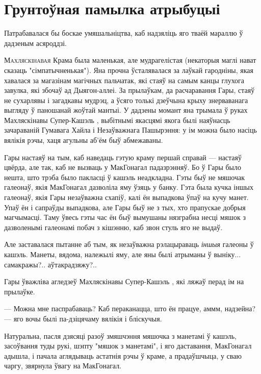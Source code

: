 \chapter{Грунтоўная памылка атрыбуцыі}

\begin{chapterOpeningQuote}
Патрабавалася бы боскае умяшальніцтва, каб надзяліць яго тваёй мараллю ў дадзеным асяроддзі. 
\end{chapterOpeningQuote}

\lettrine{М}{ахляскінавая} Крама была маленькая, але мудрагелістая (некаторыя маглі нават сказаць 
"сімпатычненькая"). Яна прочна ўсталявалася за лаўкай гародніны, якая хавалася за магазінам 
магічных пальчатак, які стаяў на самым канцы глухога завулка, які збочаў ад
Дыягон-аллеі. За прылаўкам, да расчаравання Гары, стаяў не сухарлявы і загадкавы мудрэц, 
а ўсяго толькі дзеўчына крыху знерваванага выгляду ў паношанай жоўтай мантыі. У дадзены
момант яна трымала ў руках Махляскінавы Супер-Кашэль , выбітнымі якасцямі якога былі
наяўнасць зачараваній Гумавага Хайла і Незаўважнага Пашырэння: у ім можна было насіць
вялікія рэчы, хаця агульны аб'ём быў абмежаваны.

Гары настаяў на тым, каб наведаць гэтую краму першай справай --- настаяў цвёрда, але так, каб 
не вызваць у МакГонагал падазрэнняў. Бо ў Гары было нешта, што трэба было пакласці ў кашэль
неадкладна. Гэты быў не мяшочак галеонаў, якія МакГонагал дазволіла яму ўзяць у банку. Гэта была
кучка іншых галеонаў, якія Гары незаўважна схапіў, калі ён выпадкова ўпаў
на кучу манет. Упаў ён і сапраўды выпадкова, але Гары быў не з тых, хто прапускае добрыя 
магчымасці. Таму ўвесь гэты час ён быў вымушаны нязграбна несці мяшок з дазволенымі 
галеонамі побач з кішэнню, каб звон стуль яго не выдаў.

Але заставалася пытанне аб тым, як незаўважна рэлацыраваць \emph{іншыя} галеоны ў кашэль. Манеты,
вядома, належылі яму, але яны былі атрыманы ў выніку... самакражы?.. аўтакрадзяжу?..

Гары ўважліва агледзеў Махляскінавы Супер-Кашэль , які ляжаў перад ім на прылаўке.

--- Можна мне паспрабаваць? Каб пераканацца, што ён працуе, аммм, надзейна? --- яго вочы 
былі па-дзіцячаму вялікія і бліскучыя.

Натуральна, пасля дзясяці разоў змяшчэння мяшочка з манетамі ў кашэль, засоўвання 
туды рукі, шэпту "мяшок з манетамі", і
яго даставання, МакГонагал адышла, і пачала аглядываць астатнія рэчы ў краме, а прадаўшчыца, у
сваю чаргу, звярнула ўвагу на МакГонагал.

